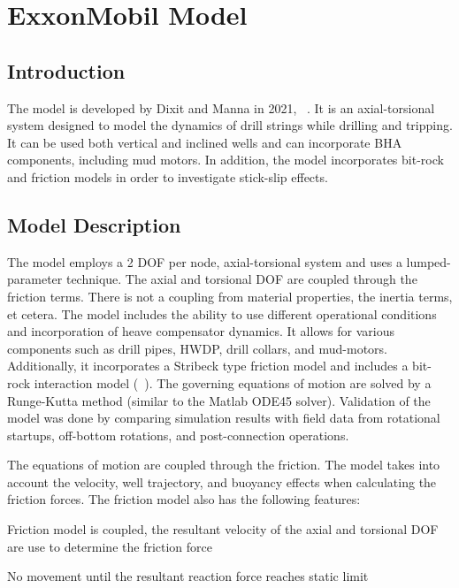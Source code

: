 \chapter{ExxonMobil Model}
\label{ch:exxonmobilmodel}

\section{Introduction}
The model is developed by Dixit and Manna in 2021, ~\cite{ref:dixit2021a}.  It is an axial-torsional system designed to model the dynamics of drill strings while drilling and tripping. It can be used both vertical and inclined wells and can incorporate BHA components, including mud motors. In addition, the model incorporates bit-rock and friction models in order to investigate stick-slip effects.

\section{Model Description}
The model employs a 2 DOF per node, axial-torsional system and uses a lumped-parameter technique.  The axial and torsional DOF are coupled through the friction terms.   There is not a coupling from material properties, the inertia terms, et cetera.  The model includes the ability to use different operational conditions and incorporation of heave compensator dynamics.  It allows for various components such as drill pipes, HWDP, drill collars, and mud-motors. Additionally, it incorporates a Stribeck type friction model and includes a bit-rock interaction model (~\cite{ref:dixit2021a}). The governing equations of motion are solved by a Runge-Kutta method (similar to the Matlab ODE45 solver). Validation of the model was done by comparing simulation results with field data from rotational startups, off-bottom rotations, and post-connection operations.


The equations of motion are coupled through the friction. The model takes into account the velocity, well trajectory, and buoyancy effects when calculating the friction forces. The friction model also has the following features:
\begin{bulletedlist}
    \item Friction model is coupled, the resultant velocity of the axial and torsional DOF are use to determine the friction force
    \item No movement until the resultant reaction force reaches static limit
\end{bulletedlist}

